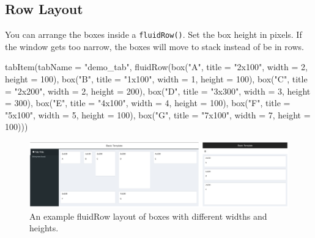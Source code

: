 \documentclass[
  oneside]{book}
\newenvironment{Shaded}{\begin{snugshade}}{\end{snugshade}}
\newcommand{\AttributeTok}[1]{\textcolor[rgb]{0.77,0.63,0.00}{#1}}
\newcommand{\DecValTok}[1]{\textcolor[rgb]{0.00,0.00,0.81}{#1}}
\newcommand{\FunctionTok}[1]{\textcolor[rgb]{0.00,0.00,0.00}{#1}}
\newcommand{\NormalTok}[1]{#1}
\newcommand{\StringTok}[1]{\textcolor[rgb]{0.31,0.60,0.02}{#1}}
\begin{document}
\hypertarget{row-layout}{%
\subsection{Row Layout}\label{row-layout}}

You can arrange the boxes inside a \texttt{fluidRow}\texttt{()}. Set the box height in pixels. If the window gets too narrow, the boxes will move to stack instead of be in rows.

\begin{Shaded}
\begin{Highlighting}[]
\FunctionTok{tabItem}\NormalTok{(}\AttributeTok{tabName =} \StringTok{"demo\_tab"}\NormalTok{, }\FunctionTok{fluidRow}\NormalTok{(}\FunctionTok{box}\NormalTok{(}\StringTok{"A"}\NormalTok{, }\AttributeTok{title =} \StringTok{"2x100"}\NormalTok{, }\AttributeTok{width =} \DecValTok{2}\NormalTok{, }\AttributeTok{height =} \DecValTok{100}\NormalTok{),}
    \FunctionTok{box}\NormalTok{(}\StringTok{"B"}\NormalTok{, }\AttributeTok{title =} \StringTok{"1x100"}\NormalTok{, }\AttributeTok{width =} \DecValTok{1}\NormalTok{, }\AttributeTok{height =} \DecValTok{100}\NormalTok{), }\FunctionTok{box}\NormalTok{(}\StringTok{"C"}\NormalTok{, }\AttributeTok{title =} \StringTok{"2x200"}\NormalTok{,}
        \AttributeTok{width =} \DecValTok{2}\NormalTok{, }\AttributeTok{height =} \DecValTok{200}\NormalTok{), }\FunctionTok{box}\NormalTok{(}\StringTok{"D"}\NormalTok{, }\AttributeTok{title =} \StringTok{"3x300"}\NormalTok{, }\AttributeTok{width =} \DecValTok{3}\NormalTok{, }\AttributeTok{height =} \DecValTok{300}\NormalTok{),}
    \FunctionTok{box}\NormalTok{(}\StringTok{"E"}\NormalTok{, }\AttributeTok{title =} \StringTok{"4x100"}\NormalTok{, }\AttributeTok{width =} \DecValTok{4}\NormalTok{, }\AttributeTok{height =} \DecValTok{100}\NormalTok{), }\FunctionTok{box}\NormalTok{(}\StringTok{"F"}\NormalTok{, }\AttributeTok{title =} \StringTok{"5x100"}\NormalTok{,}
        \AttributeTok{width =} \DecValTok{5}\NormalTok{, }\AttributeTok{height =} \DecValTok{100}\NormalTok{), }\FunctionTok{box}\NormalTok{(}\StringTok{"G"}\NormalTok{, }\AttributeTok{title =} \StringTok{"7x100"}\NormalTok{, }\AttributeTok{width =} \DecValTok{7}\NormalTok{, }\AttributeTok{height =} \DecValTok{100}\NormalTok{)))}
\end{Highlighting}
\end{Shaded}

\begin{figure}

{\centering \includegraphics[width=1\linewidth]{images/sdb_row_layout} 

}

\caption{An example fluidRow layout of boxes with different widths and heights.}\label{fig:sdb-row-layout}
\end{figure}
\end{document}
